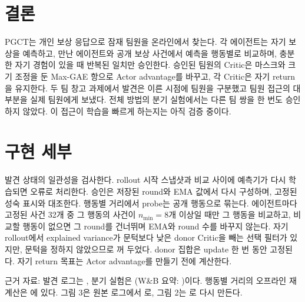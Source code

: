\documentclass[10pt,twocolumn,letterpaper]{article}
\begin{document}
\section{결론}
PGCT는 개인 보상 응답으로 잠재 팀원을 온라인에서 찾는다. 각 에이전트는 자기 보상을 예측하고, 만난 에이전트와 공개 보상 사건에서 예측을 행동별로 비교하며, 충분한 자기 경험이 있을 때 반복된 일치만 승인한다. 승인된 팀원의 Critic은 마스크와 크기 조정을 둔 Max-GAE 항으로 Actor advantage를 바꾸고, 각 Critic은 자기 return을 유지한다. 두 팀 창고 과제에서 발견은 이른 시점에 팀원을 구분했고 팀원 접근의 대부분을 실제 팀원에게 보냈다. 전체 방법의 분기 실험에서는 다른 팀 쌍을 한 번도 승인하지 않았다. 이 접근이 학습을 빠르게 하는지는 아직 검증 중이다.




\appendix
\section{구현 세부}
발견 상태의 일관성을 검사한다. rollout 시작 스냅샷과 비교 사이에 예측기가 다시 학습되면 오류로 처리한다. 승인은 저장된 round와 EMA 값에서 다시 구성하며, 고정된 성숙 표시와 대조한다. 행동별 거리에서 probe는 공개 행동으로 묶는다. 에이전트마다 고정된 사건 32개 중 그 행동의 사건이 $n_{\min}=8$개 이상일 때만 그 행동을 비교하고, 비교할 행동이 없으면 그 round를 건너뛰며 EMA와 round 수를 바꾸지 않는다. 자기 rollout에서 explained variance가 문턱보다 낮은 donor Critic을 빼는 선택 필터가 있지만, 문턱을 정하지 않았으므로 꺼 두었다. donor 집합은 update 한 번 동안 고정된다. 자기 return 목표는 Actor advantage를 만들기 전에 계산한다.

근거 자료: 발견 로그는 , 분기 실험은 (W\&B 요약: )이다. 행동별 거리의 오프라인 재계산은 에 있다. 그림 3은 원본 로그에서 로, 그림 2는 로 다시 만든다.
\end{document}
